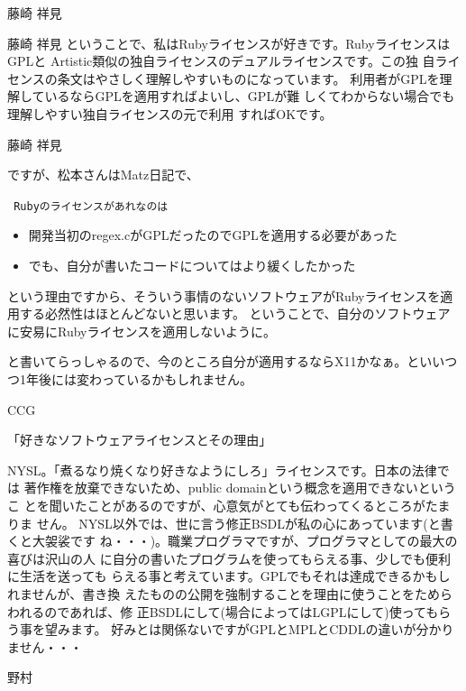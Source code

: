 \documentclass[cjk,dvipdfmx,12pt]{beamer}
\begin{document}
\begin{frame}{藤崎 祥見}
\end{frame}\begin{frame}{藤崎 祥見}
ということで、私はRubyライセンスが好きです。RubyライセンスはGPLと
	    Artistic類似の独自ライセンスのデュアルライセンスです。この独
	    自ライセンスの条文はやさしく理解しやすいものになっています。
	    利用者がGPLを理解しているならGPLを適用すればよいし、GPLが難
	    しくてわからない場合でも理解しやすい独自ライセンスの元で利用
	    すればOKです。

\end{frame}\begin{frame}{藤崎 祥見}

ですが、松本さんはMatz日記で、

{\tt
 Rubyのライセンスがあれなのは
\begin{itemize}
 \item  開発当初のregex.cがGPLだったのでGPLを適用する必要があった
 \item  でも、自分が書いたコードについてはより緩くしたかった
\end{itemize} 
という理由ですから、そういう事情のないソフトウェアがRubyライセンスを適用する必然性はほとんどないと思います。
 ということで、自分のソフトウェアに安易にRubyライセンスを適用しないように。
}

と書いてらっしゃるので、今のところ自分が適用するならX11かなぁ。といいつつ1年後には変わっているかもしれません。

\end{frame}\begin{frame}{CCG}


「好きなソフトウェアライセンスとその理由」

NYSL。「煮るなり焼くなり好きなようにしろ」ライセンスです。日本の法律では
著作権を放棄できないため、public domainという概念を適用できないというこ
とを聞いたことがあるのですが、心意気がとても伝わってくるところがたまりま
せん。
NYSL以外では、世に言う修正BSDLが私の心にあっています(と書くと大袈裟です
ね・・・)。職業プログラマですが、プログラマとしての最大の喜びは沢山の人
に自分の書いたプログラムを使ってもらえる事、少しでも便利に生活を送っても
らえる事と考えています。GPLでもそれは達成できるかもしれませんが、書き換
えたものの公開を強制することを理由に使うことをためらわれるのであれば、修
正BSDLにして(場合によってはLGPLにして)使ってもらう事を望みます。
好みとは関係ないですがGPLとMPLとCDDLの違いが分かりません・・・

\end{frame}\begin{frame}{野村}


\end{frame}
\end{document}
